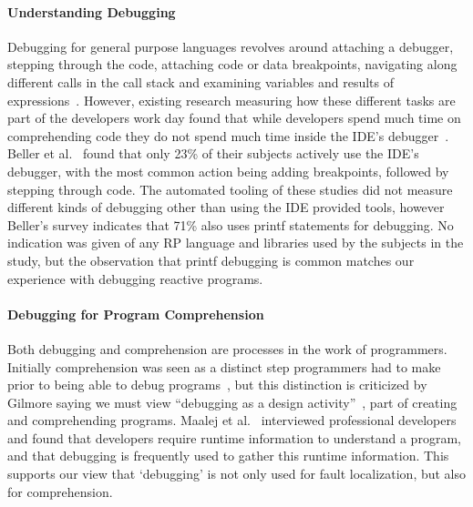 \paragraph{Understanding Debugging}
Debugging for general purpose languages revolves around 
attaching a debugger,
stepping through the code, 
attaching code or data breakpoints, 
navigating along different calls in the call stack and 
examining variables and results of expressions~\cite{Spinellis2017}.
However, existing research measuring how these different tasks are part of the developers work day found that 
while developers spend much time on comprehending code they do not spend much time inside the IDE's debugger~\cite{minelli2015know}.
Beller et al.~\cite{beller2017behavior} found that only 23\% of their subjects actively use the IDE's debugger,
with the most common action being adding breakpoints, followed by stepping through code.
The automated tooling of these studies did not measure different kinds of debugging other than using the IDE provided tools, 
however Beller's survey indicates that 71\% also uses printf statements for debugging.
No indication was given of any RP language and libraries used by the subjects in the study, 
but the observation that printf debugging is common matches our experience with debugging reactive programs.



\paragraph{Debugging for Program Comprehension}
Both debugging and comprehension are processes in the work of programmers.
Initially comprehension was seen as a distinct step programmers had to make
prior to being able to debug programs~\cite{katz1987debugging}, 
but this distinction is criticized by Gilmore saying we must view 
``debugging as a design activity''~\cite{gilmore1991models}, 
part of creating and comprehending programs. 
Maalej et al.~\cite{Maalej2014} interviewed professional developers 
and found that developers require runtime information to understand a program,
and that debugging is frequently used to gather this runtime information.
This supports our view that `debugging' is not only used for fault localization,
but also for comprehension.

